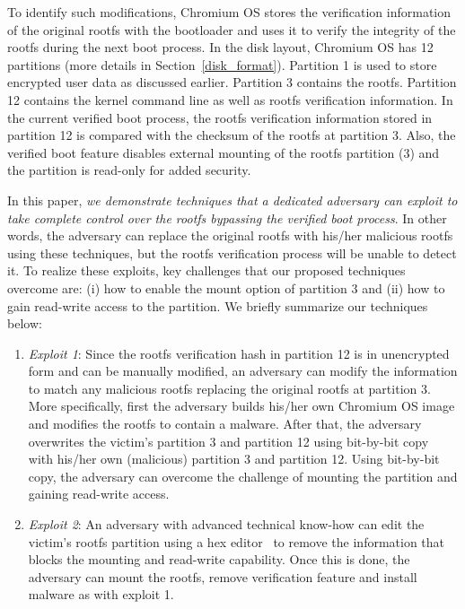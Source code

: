 \documentclass[11pt]{article}
\begin{document}
To identify such modifications, Chromium OS stores the verification information of the original rootfs with the bootloader and uses it to verify the integrity of the rootfs during the next boot process. In the disk layout, Chromium OS has 12 partitions (more details in Section~\ref{disk_format}). Partition 1 is used to store encrypted user data as discussed earlier. Partition 3 contains the rootfs. Partition 12 contains the kernel command line as well as rootfs verification  information. In the current verified boot process, the rootfs verification  information stored in partition 12 is compared with the checksum of the rootfs at partition 3. Also, the verified boot feature disables external mounting of the rootfs partition (3) and the partition is read-only for added security.


In this paper, \textit{we demonstrate techniques that a dedicated adversary can exploit to take complete control over the rootfs bypassing the verified boot process}. In other words, the adversary can replace the original rootfs with his/her malicious rootfs using these techniques, but the rootfs verification process will be unable to detect it. To realize these exploits, key challenges that our proposed techniques overcome are: (i) how to enable the mount option of partition 3 and (ii) how to gain read-write access to the partition. We briefly summarize our techniques below:

\begin{enumerate}
\item \emph{Exploit 1}: Since the rootfs verification hash in partition 12 is in unencrypted form and can be manually modified, an adversary can modify the  information to match any malicious rootfs replacing the original rootfs at partition 3. More specifically, first the adversary builds his/her own Chromium OS image and modifies the rootfs to contain a malware. After that, the adversary overwrites the victim's partition 3 and partition 12 using bit-by-bit copy~\cite{dd} with his/her own (malicious) partition 3 and partition 12. Using bit-by-bit copy, the adversary can overcome the challenge of mounting the partition and gaining read-write access. 
\item \emph{Exploit 2}: An adversary with advanced technical know-how can edit the victim's rootfs partition using a hex editor~\cite{hexeditor} to remove the information that blocks the mounting and read-write capability. Once this is done, the adversary can mount the rootfs, remove verification feature and install malware as with exploit 1. 
\end{enumerate}
\end{document}
